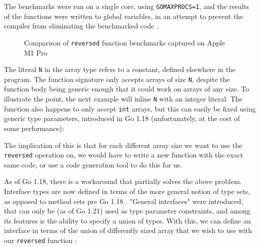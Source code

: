 The benchmarks were run on a single core, using \texttt{GOMAXPROCS=1}, and the
results of the functions were written to global variables, in an attempt to
prevent the compiler from eliminating the benchmarked code \autocite{benchPits}.

\begin{figure}
	
	\caption{Comparison of \texttt{reversed} function benchmarks captured on
		Apple M1 Pro}
\end{figure}

The literal \texttt{N} in the array type refers to a constant, defined elsewhere
in the program. The function signature only accepts arrays of size \texttt{N},
despite the function body being generic enough that it could work on arrays of
any size. To illustrate the point, the next example will inline \texttt{N} with
an integer literal. The function also happens to only accept \texttt{int}
arrays, but this can easily be fixed using generic type parameters, introduced
in Go 1.18 (unfortunately, at the cost of some performance):



The implication of this is that for each different array size we want
to use the \texttt{reversed} operation on, we would have to write a new function
with the exact same code, or use a code generation tool to do this for us.

As of Go 1.18, there is a workaround that partially solves the above problem.
Interface types are now defined in terms of the more general notion of type
sets, as opposed to method sets pre Go 1.18 \autocites{spec}{specPre1.18}.
"General interfaces" were introduced, that can only be (as of Go 1.21) used as
type parameter constraints, and among its features is the ability to specify a
union of types. With this, we can define an interface in terms of the union of
differently sized array that we wish to use with our \texttt{reversed} function
\autocite{goArrayProposal}:

